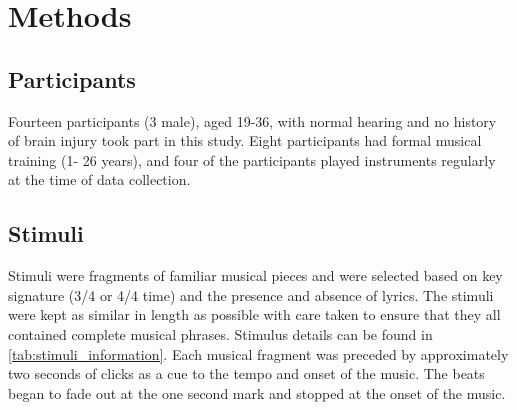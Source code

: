 \section*{Methods}
\subsection*{Participants}
Fourteen participants (3 male), aged 19-36, with normal hearing and no history of brain injury took part in this study. Eight participants had formal musical training (1- 26 years), and four of the participants played instruments regularly at the time of data collection.
\vspace{-0.5em}
\subsection*{Stimuli}
Stimuli were fragments of familiar musical pieces and were selected based on key signature (3/4 or 4/4 time) and the presence and absence of lyrics. The stimuli were kept as similar in length as possible with care taken to ensure that they all contained complete musical phrases. Stimulus details can be found in \autoref{tab:stimuli_information}.
Each musical fragment was preceded by approximately two seconds of clicks as a cue to the tempo and onset of the music. The beats began to fade out at the one second mark and stopped at the onset of the music. 

